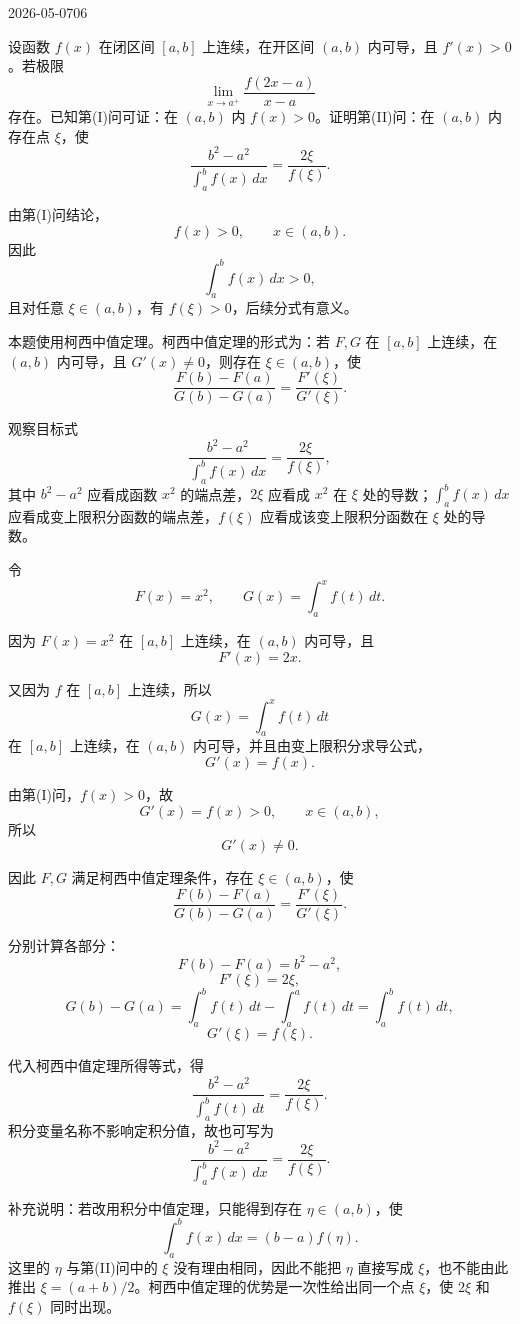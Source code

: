 \begin{mistake}{2026-05-07}{06}

\begin{problemcontent}
设函数 \(f(x)\) 在闭区间 \([a,b]\) 上连续，在开区间 \((a,b)\) 内可导，且 \(f'(x)>0\)。若极限
\[
\lim_{x\to a^+}\frac{f(2x-a)}{x-a}
\]
存在。已知第(I)问可证：在 \((a,b)\) 内 \(f(x)>0\)。证明第(II)问：在 \((a,b)\) 内存在点 \(\xi\)，使
\[
\frac{b^2-a^2}{\int_a^b f(x)\,dx}=\frac{2\xi}{f(\xi)}.
\]
\end{problemcontent}

\begin{solutioncontent}
由第(I)问结论，
\[
f(x)>0,\qquad x\in(a,b).
\]
因此
\[
\int_a^b f(x)\,dx>0,
\]
且对任意 \(\xi\in(a,b)\)，有 \(f(\xi)>0\)，后续分式有意义。

本题使用柯西中值定理。柯西中值定理的形式为：若 \(F,G\) 在 \([a,b]\) 上连续，在 \((a,b)\) 内可导，且 \(G'(x)\neq 0\)，则存在 \(\xi\in(a,b)\)，使
\[
\frac{F(b)-F(a)}{G(b)-G(a)}=\frac{F'(\xi)}{G'(\xi)}.
\]

观察目标式
\[
\frac{b^2-a^2}{\int_a^b f(x)\,dx}=\frac{2\xi}{f(\xi)},
\]
其中 \(b^2-a^2\) 应看成函数 \(x^2\) 的端点差，\(2\xi\) 应看成 \(x^2\) 在 \(\xi\) 处的导数；\(\int_a^b f(x)\,dx\) 应看成变上限积分函数的端点差，\(f(\xi)\) 应看成该变上限积分函数在 \(\xi\) 处的导数。

令
\[
F(x)=x^2,
\qquad
G(x)=\int_a^x f(t)\,dt.
\]

因为 \(F(x)=x^2\) 在 \([a,b]\) 上连续，在 \((a,b)\) 内可导，且
\[
F'(x)=2x.
\]

又因为 \(f\) 在 \([a,b]\) 上连续，所以
\[
G(x)=\int_a^x f(t)\,dt
\]
在 \([a,b]\) 上连续，在 \((a,b)\) 内可导，并且由变上限积分求导公式，
\[
G'(x)=f(x).
\]

由第(I)问，\(f(x)>0\)，故
\[
G'(x)=f(x)>0,
\qquad x\in(a,b),
\]
所以
\[
G'(x)\neq 0.
\]

因此 \(F,G\) 满足柯西中值定理条件，存在 \(\xi\in(a,b)\)，使
\[
\frac{F(b)-F(a)}{G(b)-G(a)}=\frac{F'(\xi)}{G'(\xi)}.
\]

分别计算各部分：
\[
F(b)-F(a)=b^2-a^2,
\]
\[
F'(\xi)=2\xi,
\]
\[
G(b)-G(a)
=
\int_a^b f(t)\,dt-\int_a^a f(t)\,dt
=
\int_a^b f(t)\,dt,
\]
\[
G'(\xi)=f(\xi).
\]

代入柯西中值定理所得等式，得
\[
\frac{b^2-a^2}{\int_a^b f(t)\,dt}
=
\frac{2\xi}{f(\xi)}.
\]
积分变量名称不影响定积分值，故也可写为
\[
\boxed{\frac{b^2-a^2}{\int_a^b f(x)\,dx}=\frac{2\xi}{f(\xi)}}.
\]

补充说明：若改用积分中值定理，只能得到存在 \(\eta\in(a,b)\)，使
\[
\int_a^b f(x)\,dx=(b-a)f(\eta).
\]
这里的 \(\eta\) 与第(II)问中的 \(\xi\) 没有理由相同，因此不能把 \(\eta\) 直接写成 \(\xi\)，也不能由此推出 \(\xi=(a+b)/2\)。柯西中值定理的优势是一次性给出同一个点 \(\xi\)，使 \(2\xi\) 和 \(f(\xi)\) 同时出现。
\end{solutioncontent}


\end{mistake}
